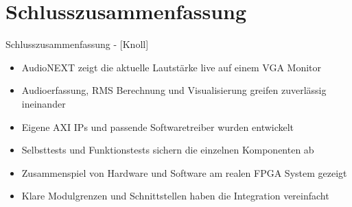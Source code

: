 \section{Schlusszusammenfassung}
\begin{frame}{Schlusszusammenfassung - [Knoll]}
    \begin{itemize}
        \item AudioNEXT zeigt die aktuelle Lautstärke live auf einem VGA Monitor
        \item Audioerfassung, RMS Berechnung und Visualisierung greifen zuverlässig ineinander
        \item Eigene AXI IPs und passende Softwaretreiber wurden entwickelt
        \item Selbsttests und Funktionstests sichern die einzelnen Komponenten ab
        \item Zusammenspiel von Hardware und Software am realen FPGA System gezeigt
        \item Klare Modulgrenzen und Schnittstellen haben die Integration vereinfacht
    \end{itemize}
\end{frame}
